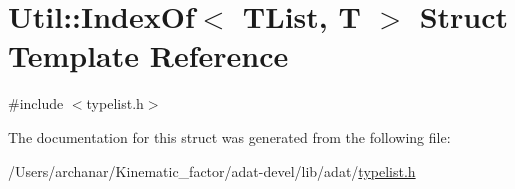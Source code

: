 \hypertarget{structUtil_1_1TL_1_1IndexOf}{}\section{Util\+:\+:Index\+Of$<$ T\+List, T $>$ Struct Template Reference}
\label{structUtil_1_1TL_1_1IndexOf}


{\ttfamily \#include $<$typelist.\+h$>$}



The documentation for this struct was generated from the following file\+:\begin{DoxyCompactItemize}
\item 
/\+Users/archanar/\+Kinematic\+\_\+factor/adat-\/devel/lib/adat/\mbox{\hyperlink{adat-devel_2lib_2adat_2typelist_8h}{typelist.\+h}}\end{DoxyCompactItemize}

